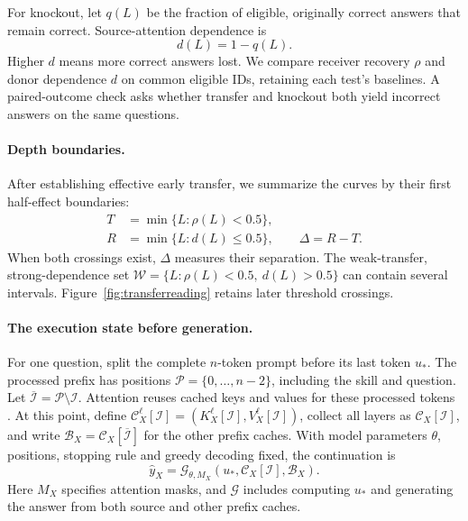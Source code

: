 For knockout, let $q(L)$ be the fraction of eligible, originally correct
answers that remain correct. Source-attention dependence is
\begin{equation}
d(L)=1-q(L).
\label{eq:dependence}
\end{equation}
Higher $d$ means more correct answers lost. We compare receiver recovery
$\rho$ and donor dependence $d$ on common eligible IDs, retaining each
test's baselines. A paired-outcome check asks whether transfer and knockout
both yield incorrect answers on the same questions.

\paragraph{Depth boundaries.}
After establishing effective early transfer, we summarize the curves by
their first half-effect boundaries:
\begin{equation}
\begin{aligned}
T&=\min\{L:\rho(L)<0.5\},\\
R&=\min\{L:d(L)\le0.5\},\qquad \Delta=R-T.
\end{aligned}
\label{eq:boundaries}
\end{equation}
When both crossings exist, $\Delta$ measures their separation.
The weak-transfer, strong-dependence set
$\mathcal W=\{L:\rho(L)<0.5,\ d(L)>0.5\}$ can contain several intervals.
Figure~\ref{fig:transferreading} retains later threshold crossings.

\paragraph{The execution state before generation.}
For one question, split the complete $n$-token prompt before its last token
$u_*$. The processed prefix has positions $\mathcal P=\{0,\ldots,n-2\}$,
including the skill and question. Let
$\overline{\mathcal I}=\mathcal P\setminus\mathcal I$.
Attention reuses cached keys and values for these processed tokens
\citep{shazeer2019fast}. At this point, define
$\mathcal C_X^\ell[\mathcal I]=(K_X^\ell[\mathcal I],V_X^\ell[\mathcal I])$,
collect all layers as $\mathcal C_X[\mathcal I]$, and write
$\mathcal B_X=\mathcal C_X[\overline{\mathcal I}]$ for the other prefix
caches. With model parameters $\theta$, positions, stopping rule and
greedy decoding fixed, the continuation is
\begin{equation}
\hat y_X=\mathcal G_{\theta,M_X}
       (u_*,\mathcal C_X[\mathcal I],\mathcal B_X).
\label{eq:continuation}
\end{equation}
Here $M_X$ specifies attention masks, and $\mathcal G$ includes computing
$u_*$ and generating the answer from both source and other prefix caches.

